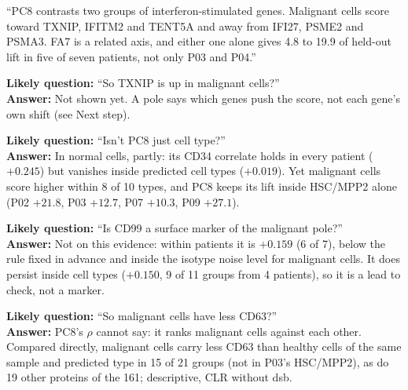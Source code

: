 \begin{teambox}
``PC8 contrasts two groups of interferon-stimulated genes. Malignant cells score toward TXNIP, IFITM2 and TENT5A and away from IFI27, PSME2 and PSMA3. FA7 is a related axis, and either one alone gives 4.8 to 19.9\pp{} of held-out lift in five of seven patients, not only P03 and P04.''

\textbf{Likely question:} ``So TXNIP is up in malignant cells?''\\
\textbf{Answer:} Not shown yet. A pole says which genes push the score, not each gene's own shift (see Next step).

\textbf{Likely question:} ``Isn't PC8 just cell type?''\\
\textbf{Answer:} In normal cells, partly: its CD34 correlate holds in every patient ($+0.245$) but vanishes inside predicted cell types ($+0.019$). Yet malignant cells score higher within 8 of 10 types, and PC8 keeps its lift inside HSC/MPP2 alone (P02 $+21.8$, P03 $+12.7$, P07 $+10.3$, P09 $+27.1$\pp).

\textbf{Likely question:} ``Is CD99 a surface marker of the malignant pole?''\\
\textbf{Answer:} Not on this evidence: within patients it is $+0.159$ (6 of 7), below the rule fixed in advance and inside the isotype noise level for malignant cells. It does persist inside cell types ($+0.150$, 9 of 11 groups from 4 patients), so it is a lead to check, not a marker.

\textbf{Likely question:} ``So malignant cells have less CD63?''\\
\textbf{Answer:} PC8's $\rho$ cannot say: it ranks malignant cells against each other. Compared directly, malignant cells carry less CD63 than healthy cells of the same sample and predicted type in 15 of 21 groups (not in P03's HSC/MPP2), as do 19 other proteins of the 161; descriptive, CLR without dsb.
\end{teambox}

